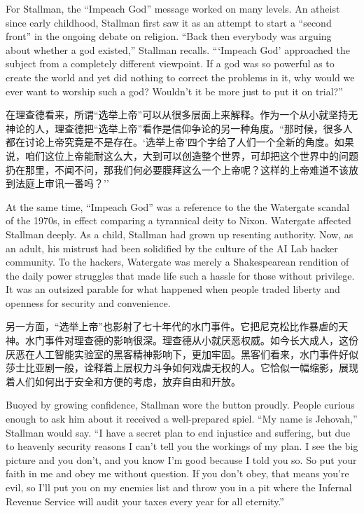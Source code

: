 \ifdefined\eng
For Stallman, the ``Impeach God'' message worked on many levels. An atheist since early childhood, Stallman first saw it as an attempt to start a ``second front'' in the ongoing debate on religion. ``Back then everybody was arguing about whether a god existed,'' Stallman recalls. ```Impeach God' approached the subject from a completely different viewpoint. If a god was so powerful as to create the world and yet did nothing to correct the problems in it, why would we ever want to worship such a god? Wouldn't it be more just to put it on trial?''
\fi

\ifdefined\chs
在理查德看来，所谓``选举上帝''可以从很多层面上来解释。作为一个从小就坚持无神论的人，理查德把``选举上帝''看作是信仰争论的另一种角度。``那时候，很多人都在讨论上帝究竟是不是存在。`选举上帝'四个字给了人们一个全新的角度。如果说，咱们这位上帝能耐这么大，大到可以创造整个世界，可却把这个世界中的问题扔在那里，不闻不问，那我们何必要膜拜这么一个上帝呢？这样的上帝难道不该放到法庭上审讯一番吗？''
\fi

\ifdefined\eng
At the same time, ``Impeach God'' was a reference to the the Watergate scandal of the 1970s, in effect comparing a tyrannical deity to Nixon.  Watergate affected Stallman deeply. As a child, Stallman had grown up resenting authority. Now, as an adult, his mistrust had been solidified by the culture of the AI Lab hacker community. To the hackers, Watergate was merely a Shakespearean rendition of the daily power struggles that made life such a hassle for those without privilege. It was an outsized parable for what happened when people traded liberty and openness for security and convenience.
\fi

\ifdefined\chs
另一方面，``选举上帝''也影射了七十年代的水门事件。它把尼克松比作暴虐的天神。水门事件对理查德的影响很深。理查德从小就厌恶权威。如今长大成人，这份厌恶在人工智能实验室的黑客精神影响下，更加牢固。黑客们看来，水门事件好似莎士比亚剧一般，诠释着上层权力斗争如何戏虐无权的人。它恰似一幅缩影，展现着人们如何出于安全和方便的考虑，放弃自由和开放。
\fi

\ifdefined\eng
Buoyed by growing confidence, Stallman wore the button proudly. People curious enough to ask him about it received a well-prepared spiel. ``My name is Jehovah,'' Stallman would say. ``I have a secret plan to end injustice and suffering, but due to heavenly security reasons I can't tell you the workings of my plan. I see the big picture and you don't, and you know I'm good because I told you so. So put your faith in me and obey me without question. If you don't obey, that means you're evil, so I'll put you on my enemies list and throw you in a pit where the Infernal Revenue Service will audit your taxes every year for all eternity.''
\fi

